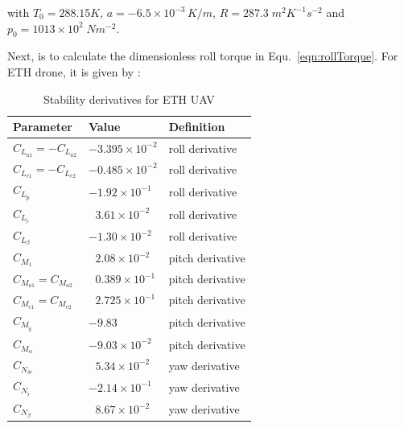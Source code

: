 with $T_0=288.15K$, $a = -6.5 \times 10^{-3} \, K/m$, $R=287.3\;m^2K^{-1}s^{-2}$ and $p_0=1013 \times 10^2 \;Nm^{-2}$.

Next, is to calculate the dimensionless roll torque in Equ.~\ref{eqn:rollTorque}.
For ETH drone, it is given by \cite{stevens2015aircraft,ducard2009fault,mockli2006guidance} :

\begin{table}
\label{arm:momentsETHcraft}
\caption{Stability derivatives for ETH UAV \cite{ducard2009fault}}
\label{arm:ethcraftStabilityDeriv}
\begin{center}
\begin{tabular}{ ||p{3cm}|p{3cm}|p{3cm}||}\hline
\textbf{Parameter} & \textbf{Value} & \textbf{Definition} \\\hline
$C_{L_{a1}} = - C_{L_{a2}}$ & $-3.395 \times 10^{-2}$	   & roll derivative \\\hline
$C_{L_{e1}} = - C_{L_{e2}}$ & $-0.485 \times 10^{-2}$         & roll derivative \\\hline
$C_{L_{\tilde{p}}}$                 & $-1.92 \times 10^{-1}$	   & roll derivative \\\hline
$C_{L_{\tilde{r}}} $                 & $\ \ \, 3.61 \times 10^{-2}$     & roll derivative \\\hline
$C_{L_\beta}$                        & $-1.30 \times 10^{-2}$	   & roll derivative \\\hline
$ C_{M_{1}}$                          & $\ \ \, 2.08 \times 10^{-2}$	   & pitch derivative \\\hline
$C_{M_{a1}} = C_{M_{a2}} $ & $\ \ \, 0.389 \times 10^{-1}$  & pitch derivative \\\hline
$C_{M_{e1}} = C_{M_{e2}} $ & $\ \ \, 2.725 \times 10^{-1}$  &  pitch derivative \\\hline
$C_{M_{\tilde{q}}} $               & $-9.83$	                            & pitch derivative \\\hline
$C_{M_\alpha} $                    & $-9.03 \times 10^{-2}$ 	   & pitch derivative \\\hline
$C_{N_{\delta r}}$                  & $\ \ \, 5.34 \times 10^{-2}$ 	   & yaw derivative \\\hline
$ C_{N_{\tilde{r}}}$                 & $-2.14 \times 10^{-1}$	   & yaw derivative \\\hline
$C_{N_\beta} $                       & $\ \ \, 8.67 \times 10^{-2}$	     & yaw derivative \\\hline
\end{tabular}
\end{center}
\end{table}


